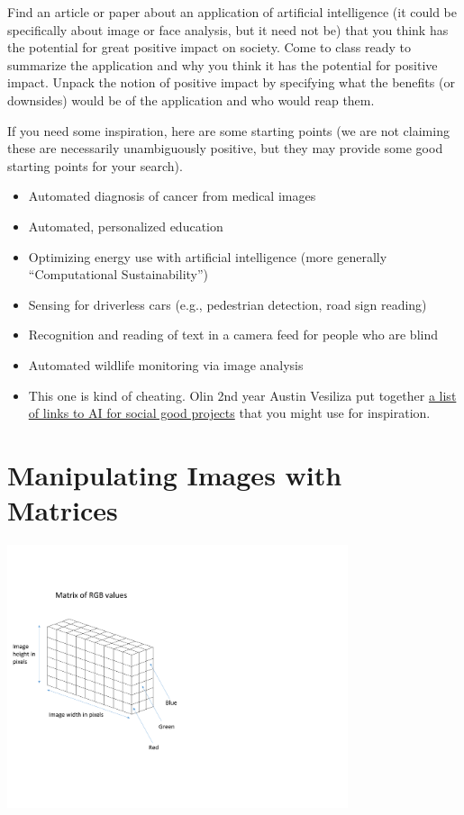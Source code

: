\begin{prob}
Find an article or paper about an application of artificial intelligence (it could be specifically about image or face analysis, but it need not be) that you think has the potential for great positive impact on society.  Come to class ready to summarize the application and why you think it has the potential for positive impact.  Unpack the notion of positive impact by specifying what the benefits (or downsides) would be of the application and who would reap them.

If you need some inspiration, here are some starting points (we are not claiming these are necessarily unambiguously positive, but they may provide some good starting points for your search).
\begin{itemize}
\item Automated diagnosis of cancer from medical images
\item Automated, personalized education
\item Optimizing energy use with artificial intelligence (more generally ``Computational Sustainability'')
\item Sensing for driverless cars (e.g., pedestrian detection, road sign reading)
\item Recognition and reading of text in a camera feed for people who are blind
\item Automated wildlife monitoring via image analysis
\item This one is kind of cheating. Olin 2nd year Austin Vesiliza put together \href{https://www.notion.so/ML-for-Good-c0cc352c88b04e719c187c8e4a6f5887}{a list of links to AI for social good projects} that you might use for inspiration.
\end{itemize}
\end{prob}

\section{Manipulating Images with Matrices}

\begin{center}
\includegraphics[width=0.75\textwidth]{FacesNight1/figs/RGBArrayWithSlice.pdf}
\label{fig:StackedRGBArray}
\label{fig:RGBArray}
\end{center}

